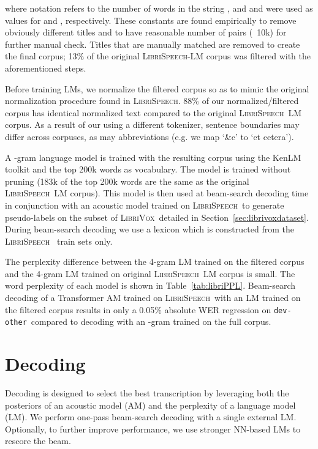 \documentclass{article}
\def\devother{\texttt{dev-other}}
\newcommand{\librivox}{\textsc{LibriVox}}
\newcommand{\librispeech}{\textsc{LibriSpeech}}
\begin{document}
where notation  refers to the number of words in the string , and  and  were used as values for  and , respectively. These constants are found empirically to remove obviously different titles and to have reasonable number of pairs (~10k) for further manual check. Titles that are manually matched are removed to create the final corpus; 13\% of the original \librispeech-LM corpus was filtered with the aforementioned steps.

Before training LMs, we normalize the filtered corpus so as to mimic the original normalization procedure found in \librispeech. 88\% of our normalized/filtered corpus has identical normalized text compared to the original \librispeech~LM corpus. As a result of our using a different tokenizer, sentence boundaries may differ across corpuses, as may abbreviations (e.g. we map `\&c' to `et cetera').

A -gram language model is trained with the resulting corpus using the KenLM toolkit \cite{heafield2011kenlm} and the top 200k words as vocabulary. The model is trained without pruning (183k of the top 200k words are the same as the original \librispeech~LM corpus). This model is then used at beam-search decoding time in conjunction with an acoustic model trained on \librispeech~to generate pseudo-labels on the subset of \librivox~detailed in Section~\ref{sec:librivoxdataset}. During beam-search decoding we use a lexicon which is constructed from the \librispeech~ train sets only.

The perplexity difference between the 4-gram LM trained on the filtered corpus and the 4-gram LM trained on original \librispeech~LM corpus is small. The word perplexity of each model is shown in Table~\ref{tab:libriPPL}. Beam-search decoding of a Transformer AM trained on \librispeech~with an LM trained on the filtered corpus results in only a 0.05\% absolute WER regression on \devother~compared to decoding with an -gram trained on the full corpus.

\section{Decoding}

Decoding is designed to select the best transcription by leveraging both the posteriors of an acoustic model (AM) and the perplexity of a language model (LM). We perform one-pass beam-search decoding with a single external LM. Optionally, to further improve performance, we use stronger NN-based LMs to rescore the beam.
\end{document}
